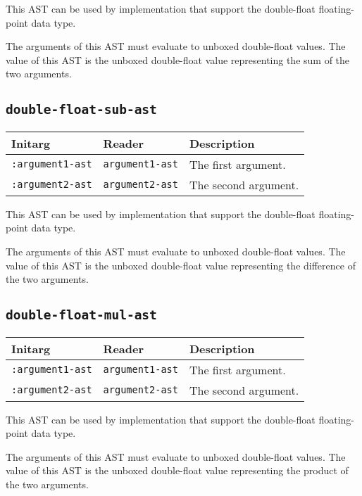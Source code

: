 This AST can be used by implementation that support the double-float
floating-point data type.  

The arguments of this AST must evaluate to unboxed double-float
values.  The value of this AST is the unboxed double-float value
representing the sum of the two arguments.

\subsection{\texttt{double-float-sub-ast}}
\label{sec-ast-double-float-sub}

\begin{tabular}{|l|l|l|}
\hline
Initarg & Reader & Description\\
\hline\hline
\texttt{:argument1-ast} & \texttt{argument1-ast} & The first argument.\\
\hline
\texttt{:argument2-ast} & \texttt{argument2-ast} & The second argument.\\
\hline
\end{tabular}

This AST can be used by implementation that support the double-float
floating-point data type.  

The arguments of this AST must evaluate to unboxed double-float
values.  The value of this AST is the unboxed double-float value
representing the difference of the two arguments.

\subsection{\texttt{double-float-mul-ast}}
\label{sec-ast-double-float-mul}

\begin{tabular}{|l|l|l|}
\hline
Initarg & Reader & Description\\
\hline\hline
\texttt{:argument1-ast} & \texttt{argument1-ast} & The first argument.\\
\hline
\texttt{:argument2-ast} & \texttt{argument2-ast} & The second argument.\\
\hline
\end{tabular}

This AST can be used by implementation that support the double-float
floating-point data type.  

The arguments of this AST must evaluate to unboxed double-float
values.  The value of this AST is the unboxed double-float value
representing the product of the two arguments.

